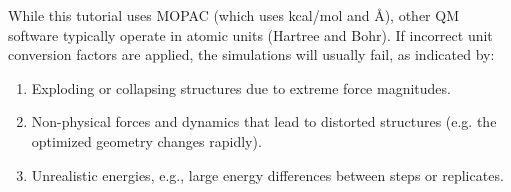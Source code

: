 While this tutorial uses MOPAC (which uses kcal/mol and Å), other QM software typically operate in atomic units (Hartree and Bohr). 
If incorrect unit conversion factors are applied, the simulations will usually fail, as indicated by:

\begin{enumerate}
  \item[-] Exploding or collapsing structures due to extreme force magnitudes.
  \item[-] Non-physical forces and dynamics that lead to distorted structures (e.g. the optimized geometry changes rapidly).
  \item[-] Unrealistic energies, e.g., large energy differences between steps or replicates.
\end{enumerate}

